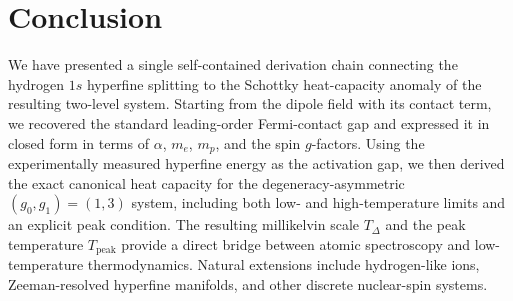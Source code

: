 \documentclass[11pt,a4paper]{article}
\begin{document}
    \section{Conclusion}
    \label{sec:conclusion}
    
    We have presented a single self-contained derivation chain connecting the hydrogen $1s$ hyperfine splitting
    to the Schottky heat-capacity anomaly of the resulting two-level system.
    Starting from the dipole field with its contact term, we recovered the standard leading-order Fermi-contact gap
    and expressed it in closed form in terms of $\alpha$, $m_e$, $m_p$, and the spin $g$-factors.
    Using the experimentally measured hyperfine energy as the activation gap, we then derived the exact canonical
    heat capacity for the degeneracy-asymmetric $(g_0,g_1)=(1,3)$ system, including both low- and high-temperature limits
    and an explicit peak condition.
    The resulting millikelvin scale $T_\Delta$ and the peak temperature $T_{\mathrm{peak}}$ provide a direct bridge
    between atomic spectroscopy and low-temperature thermodynamics.
    Natural extensions include hydrogen-like ions, Zeeman-resolved hyperfine manifolds, and other discrete nuclear-spin systems.
\end{document}

